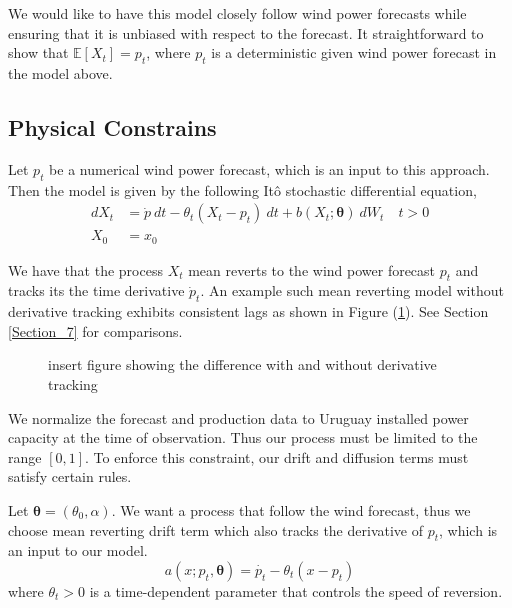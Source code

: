 \documentclass[10pt,twocolumn,letterpaper]{article}
\newcommand{\E}{\mathbb{E}}
\begin{document}
We would like to have this model closely follow wind power forecasts while ensuring that it is unbiased with respect to the forecast. It straightforward to show that $\E\left[X_t\right] = p_t$, where $p_t$ is a deterministic given wind power forecast in the model above.

\subsection{Physical Constrains}

Let $p_t$ be a numerical wind power forecast, which is an input to this approach. Then the model is given by the following It\^{o} stochastic differential equation,
\begin{equation}
\begin{split}
dX_t&= \dot{p} \ dt - \theta_t(X_t - p_t) \ dt + b (X_t; \bm{\theta} ) \ dW_t \quad t > 0 \\
X_0&=x_0
\end{split}
\label{model:derivative_tracking_X}
\end{equation}

We have that the process $X_t$ mean reverts to the wind power forecast $p_t$ and tracks its the time derivative $\dot{p}_t$.  An example such mean reverting model without derivative tracking exhibits consistent lags as shown in Figure (\ref{fig:derivative_tracking}). See Section \ref{Section_7} for comparisons.

\begin{figure}
  \caption{insert figure showing the difference with and without derivative tracking}
  \label{fig:derivative_tracking}
\end{figure}



 We normalize the forecast and production data to Uruguay  installed power capacity at the time of observation. Thus our process must be limited to the range $[0,1]$. To enforce this constraint, our  drift and diffusion terms  must satisfy certain rules.
 

Let $\bm{\theta} = (\theta_0,\alpha)$. We want a process that follow the wind forecast, thus we choose mean reverting drift term which also tracks the derivative of $p_t$, which is an input to our model.
  \begin{equation}
    a(x; p_t,\bm{\theta})=  \dot{p_t} - \theta_t(x - p_t)
  \end{equation}
where $\theta_t>0$ is a time-dependent parameter that controls the speed of reversion.
\end{document}
